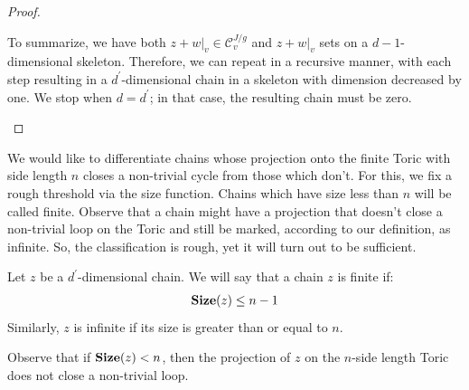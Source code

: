 \begin{proof}
\begin{enumerate}
To summarize, we have both $z + w|_{v} \in \mathcal{C}_{v}^{J/g}$ and $z+w|_{v}$ sets on a $d-1$-dimensional skeleton. Therefore, we can repeat in a recursive manner, with each step resulting in a $d^{\prime}$-dimensional chain in a skeleton with dimension decreased by one. We stop when $d = d^{\prime}$; in that case, the resulting chain must be zero.
  \end{enumerate}
\end{proof}

We would like to differentiate chains whose projection onto the finite Toric with side length $n$ closes a non-trivial cycle from those which don't. For this, we fix a rough threshold via the size function. Chains which have size less than $n$ will be called finite. Observe that a chain might have a projection that doesn't close a non-trivial loop on the Toric and still be marked, according to our definition, as infinite. So, the classification is rough, yet it will turn out to be sufficient.
\begin{definition}
  \label{def:finiteerr}
  Let $z$ be a $d^{\prime}$-dimensional chain. We will say that a chain $z$ is finite if:
  \begin{equation*}
    \begin{split}
        \Size{z} \le n-1     %
    \end{split}
  \end{equation*}
Similarly, $z$ is infinite if its size is greater than or equal to $n$.
\end{definition}

\begin{remark}
Observe that if $\mathbf{Size}(z) < n$, then the projection of $z$ on the $n$-side length Toric does not close a non-trivial loop.
\end{remark}


